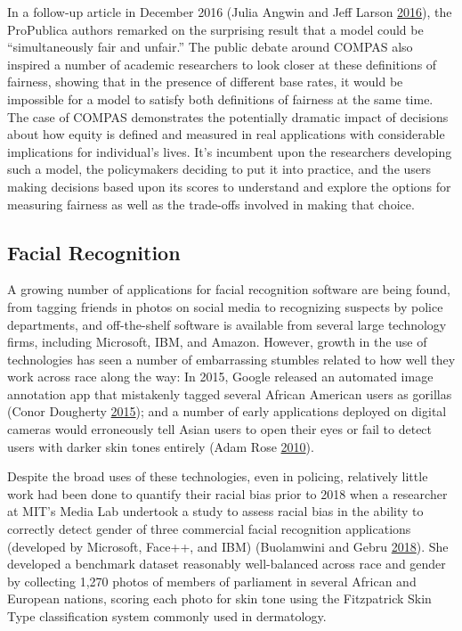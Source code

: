 \documentclass[]{krantz}
\begin{document}
In a follow-up article in December 2016 (Julia Angwin and Jeff Larson
\protect\hyperlink{ref-angwin2016b}{2016}), the ProPublica authors
remarked on the surprising result that a model could be ``simultaneously
fair and unfair.'' The public debate around COMPAS also inspired a
number of academic researchers to look closer at these definitions of
fairness, showing that in the presence of different base rates, it would
be impossible for a model to satisfy both definitions of fairness at the
same time. The case of COMPAS demonstrates the potentially dramatic
impact of decisions about how equity is defined and measured in real
applications with considerable implications for individual's lives. It's
incumbent upon the researchers developing such a model, the policymakers
deciding to put it into practice, and the users making decisions based
upon its scores to understand and explore the options for measuring
fairness as well as the trade-offs involved in making that choice.

\subsection{Facial Recognition}\label{facial-recognition}

A growing number of applications for facial recognition software are
being found, from tagging friends in photos on social media to
recognizing suspects by police departments, and off-the-shelf software
is available from several large technology firms, including Microsoft,
IBM, and Amazon. However, growth in the use of technologies has seen a
number of embarrassing stumbles related to how well they work across
race along the way: In 2015, Google released an automated image
annotation app that mistakenly tagged several African American users as
gorillas (Conor Dougherty \protect\hyperlink{ref-dougherty2015}{2015});
and a number of early applications deployed on digital cameras would
erroneously tell Asian users to open their eyes or fail to detect users
with darker skin tones entirely (Adam Rose
\protect\hyperlink{ref-rose2010}{2010}).

Despite the broad uses of these technologies, even in policing,
relatively little work had been done to quantify their racial bias prior
to 2018 when a researcher at MIT's Media Lab undertook a study to assess
racial bias in the ability to correctly detect gender of three
commercial facial recognition applications (developed by Microsoft,
Face++, and IBM) (Buolamwini and Gebru
\protect\hyperlink{ref-buolamwini2018}{2018}). She developed a benchmark
dataset reasonably well-balanced across race and gender by collecting
1,270 photos of members of parliament in several African and European
nations, scoring each photo for skin tone using the Fitzpatrick Skin
Type classification system commonly used in dermatology.
\end{document}
